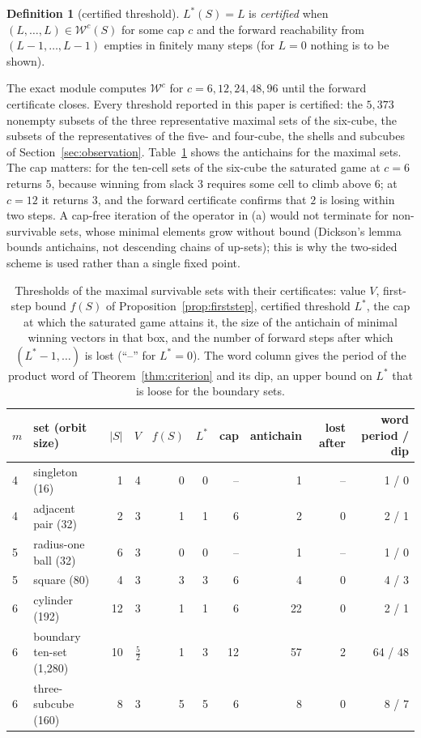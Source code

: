 \documentclass[11pt,a4paper]{article}
\theoremstyle{plain}
\theoremstyle{definition}
\newtheorem{definition}[theorem]{Definition}
\theoremstyle{remark}
\newcommand{\calW}{\mathcal{W}}
\newcommand{\tfr}[2]{\tfrac{#1}{#2}}
\newcommand{\Lstar}{L^{\ast}}
\begin{document}
\begin{definition}[certified threshold]
$\Lstar(S)=L$ is \emph{certified} when $(L,\dots,L)\in\calW^{c}(S)$ for some cap $c$ and the forward reachability from $(L-1,\dots,L-1)$ empties in finitely many steps (for $L=0$ nothing is to be shown).
\end{definition}

The exact module computes $\calW^{c}$ for $c=6,12,24,48,96$ until the forward certificate closes. Every threshold reported in this paper is certified: the $5{,}373$ nonempty subsets of the three representative maximal sets of the six-cube, the subsets of the representatives of the five- and four-cube, the shells and subcubes of Section~\ref{sec:observation}. Table~\ref{tab:game} shows the antichains for the maximal sets. The cap matters: for the ten-cell sets of the six-cube the saturated game at $c=6$ returns $5$, because winning from slack $3$ requires some cell to climb above $6$; at $c=12$ it returns $3$, and the forward certificate confirms that $2$ is losing within two steps. A cap-free iteration of the operator in (a) would not terminate for non-survivable sets, whose minimal elements grow without bound (Dickson's lemma \cite{Dickson1913} bounds antichains, not descending chains of up-sets); this is why the two-sided scheme is used rather than a single fixed point.

\begin{table}[t]
\centering\small
\caption{Thresholds of the maximal survivable sets with their certificates: value $V$, first-step bound $f(S)$ of Proposition~\ref{prop:firststep}, certified threshold $\Lstar$, the cap at which the saturated game attains it, the size of the antichain of minimal winning vectors in that box, and the number of forward steps after which $(\Lstar-1,\dots)$ is lost (``--'' for $\Lstar=0$). The word column gives the period of the product word of Theorem~\ref{thm:criterion} and its dip, an upper bound on $\Lstar$ that is loose for the boundary sets.}
\label{tab:game}
\begin{tabular}{llrrrrrrrr}
\toprule
$m$ & set (orbit size) & $|S|$ & $V$ & $f(S)$ & $\Lstar$ & cap & antichain & lost after & word period / dip\\
\midrule
4 & singleton (16) & 1 & 4 & 0 & 0 & -- & 1 & -- & 1 / 0\\
4 & adjacent pair (32) & 2 & 3 & 1 & 1 & 6 & 2 & 0 & 2 / 1\\
5 & radius-one ball (32) & 6 & 3 & 0 & 0 & -- & 1 & -- & 1 / 0\\
5 & square (80) & 4 & 3 & 3 & 3 & 6 & 4 & 0 & 4 / 3\\
6 & cylinder (192) & 12 & 3 & 1 & 1 & 6 & 22 & 0 & 2 / 1\\
6 & boundary ten-set (1{,}280) & 10 & $\tfr52$ & 1 & 3 & 12 & 57 & 2 & 64 / 48\\
6 & three-subcube (160) & 8 & 3 & 5 & 5 & 6 & 8 & 0 & 8 / 7\\
\bottomrule
\end{tabular}
\end{table}
\end{document}
